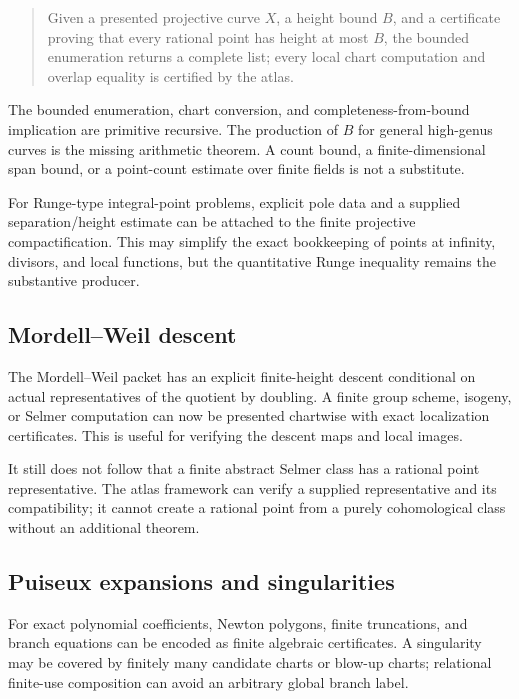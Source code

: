 \begin{quote}
Given a presented projective curve $X$, a height bound $B$, and a certificate proving that every
rational point has height at most $B$, the bounded enumeration returns a complete list; every local
chart computation and overlap equality is certified by the atlas.
\end{quote}

The bounded enumeration, chart conversion, and completeness-from-bound implication are primitive
recursive.  The production of $B$ for general high-genus curves is the missing arithmetic theorem.
A count bound, a finite-dimensional span bound, or a point-count estimate over finite fields is not a
substitute.

For Runge-type integral-point problems, explicit pole data and a supplied separation/height estimate
can be attached to the finite projective compactification.  This may simplify the exact bookkeeping
of points at infinity, divisors, and local functions, but the quantitative Runge inequality remains
the substantive producer.

\subsection{Mordell--Weil descent}

The Mordell--Weil packet has an explicit finite-height descent conditional on actual representatives
of the quotient by doubling.  A finite group scheme, isogeny, or Selmer computation can now be
presented chartwise with exact localization certificates.  This is useful for verifying the descent
maps and local images.

It still does not follow that a finite abstract Selmer class has a rational point representative.
The atlas framework can verify a supplied representative and its compatibility; it cannot create a
rational point from a purely cohomological class without an additional theorem.

\subsection{Puiseux expansions and singularities}

For exact polynomial coefficients, Newton polygons, finite truncations, and branch equations can be
encoded as finite algebraic certificates.  A singularity may be covered by finitely many candidate
charts or blow-up charts; relational finite-use composition can avoid an arbitrary global branch
label.

